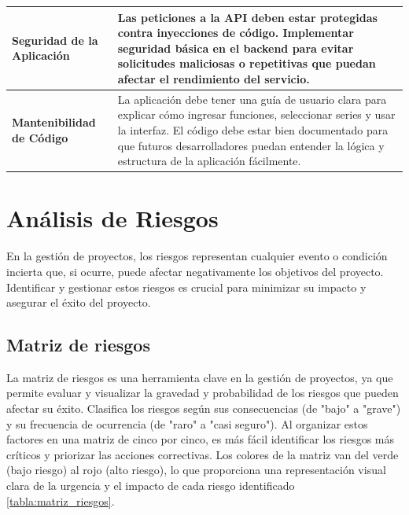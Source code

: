 \begin{longtable}{|m{5cm}|m{10cm}|}
	\hline
	\textbf{Seguridad de la Aplicación} & Las peticiones a la API deben estar protegidas contra inyecciones de código. Implementar seguridad básica en el backend para evitar solicitudes maliciosas o repetitivas que puedan afectar el rendimiento del servicio. \\
	\hline
	\textbf{Mantenibilidad de Código} & La aplicación debe tener una guía de usuario clara para explicar cómo ingresar funciones, seleccionar series y usar la interfaz. El código debe estar bien documentado para que futuros desarrolladores puedan entender la lógica y estructura de la aplicación fácilmente. \\
	\hline
\end{longtable}
\caption{Tabla de requerimientos no funcionales} \label{tabla:RNF}
\vspace{0.5cm}



\section{Análisis de Riesgos}
En la gestión de proyectos, los riesgos representan cualquier evento o condición incierta que, si ocurre, puede afectar negativamente los objetivos del proyecto. Identificar y gestionar estos riesgos es crucial para minimizar su impacto y asegurar el éxito del proyecto. 
\subsection{Matriz de riesgos}
La matriz de riesgos es una herramienta clave en la gestión de proyectos, ya que permite evaluar y visualizar la gravedad y probabilidad de los riesgos que pueden afectar su éxito. Clasifica los riesgos según sus consecuencias (de "bajo" a "grave") y su frecuencia de ocurrencia (de "raro" a "casi seguro"). Al organizar estos factores en una matriz de cinco por cinco, es más fácil identificar los riesgos más críticos y priorizar las acciones correctivas. Los colores de la matriz van del verde (bajo riesgo) al rojo (alto riesgo), lo que proporciona una representación visual clara de la urgencia y el impacto de cada riesgo identificado \ref{tabla:matriz_riesgos}.

